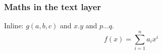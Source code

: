 \documentclass[aspectratio=169]{beamer}
\begin{document}
\begin{frame}
\frametitle{Maths in the text layer}
Inline: $g(a, b, c)$ and $x.y$ and $p \ldots q$.
\[ f(x) = \sum_{i=1}^{n} a_i x^i \]
\end{frame}
\end{document}
